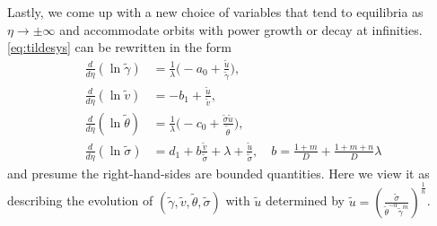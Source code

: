 \documentclass[a4paper,11pt]{article}
\def\tg{{\tilde{\gamma}}}
\def\tv{{\tilde{v}}}
\def\tth{{\tilde{\theta}}}
\def\ts{{\tilde{\sigma}}}
\def\tu{{\tilde{u}}}
\theoremstyle{remark}
\begin{document}
Lastly, we come up with a new choice of variables that tend to equilibria as $\eta \rightarrow \pm \infty$ and accommodate
orbits with power growth or decay at infinities. \eqref{eq:tildesys} can be rewritten in the form
\begin{equation}
 \label{eq:tildesys2}
\begin{aligned}
\frac{d}{d\eta}{(\ln{\tg})}  &=  \tfrac{1}{\lambda} \big (- a_0 +  \frac{\tu}{\tg} \big ),
\\
\frac{d}{d\eta}{(\ln{\tv})}  &=  - b_1 + \frac{\tu}{\tv} , 
\\
\frac{d}{d\eta}{(\ln{\tth})} &=   \tfrac{1}{\lambda} \big (- c_0 +  \frac{\ts \tu}{\tth} \big ), 
\\
\frac{d}{d\eta}{(\ln{\ts})} &= d_1 + b \frac{\tv}{\ts} + \lambda + \frac{\tu}{\ts}, \quad b = \frac{1+m}{D} + \frac{1+m+n}{D}\lambda
\end{aligned}
\end{equation}
and presume the right-hand-sides are bounded quantities. Here we view it as describing the evolution of $(\tg,\tv,\tth,\ts)$ with $\tu$ determined by $\tu = \left ( \frac{\ts}{ \tth^{-\alpha} \tg^m} \right )^\frac{1}{n}$.
\end{document}
